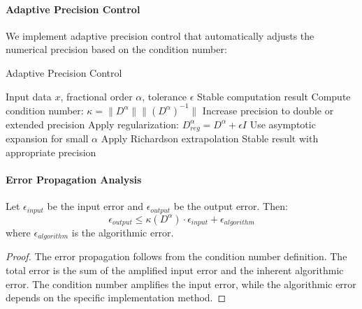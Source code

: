 \paragraph{Adaptive Precision Control}

We implement adaptive precision control that automatically adjusts the numerical precision based on the condition number:

\begin{algorithm}[h]
\caption{Adaptive Precision Control}
\begin{algorithmic}[1]
\REQUIRE Input data $x$, fractional order $\alpha$, tolerance $\epsilon$
\ENSURE Stable computation result
\STATE Compute condition number: $\kappa = \|D^{\alpha}\| \|(D^{\alpha})^{-1}\|$
    \STATE Increase precision to double or extended precision
    \STATE Apply regularization: $D^{\alpha}_{reg} = D^{\alpha} + \epsilon I$
\ENDIF
{}
    \STATE Use asymptotic expansion for small $\alpha$
    \STATE Apply Richardson extrapolation
\ENDIF
\RETURN Stable result with appropriate precision
\end{algorithmic}
\end{algorithm}

\paragraph{Error Propagation Analysis}

\begin{theorem}
Let $\epsilon_{input}$ be the input error and $\epsilon_{output}$ be the output error. Then:
\begin{equation}
\epsilon_{output} \leq \kappa(D^{\alpha}) \cdot \epsilon_{input} + \epsilon_{algorithm}
\end{equation}
where $\epsilon_{algorithm}$ is the algorithmic error.
\end{theorem}

\begin{proof}
The error propagation follows from the condition number definition. The total error is the sum of the amplified input error and the inherent algorithmic error. The condition number amplifies the input error, while the algorithmic error depends on the specific implementation method.
\end{proof}
